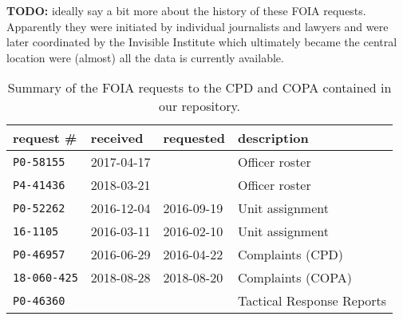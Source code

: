 \textbf{TODO:} ideally say a bit more about the history of these FOIA requests.
Apparently they were initiated by individual journalists and lawyers and were
later coordinated by the Invisible Institute which ultimately became the
central location were (almost) all the data is currently available.

\begin{table}[h]
	\begin{center}
\begin{tabular}{@{}llll@{}}
	\toprule
	request \#&received&requested&description\\
\midrule
	\texttt{P0-58155}&2017-04-17& &Officer roster\\
	\texttt{P4-41436}&2018-03-21& &Officer roster\\
		\texttt{P0-52262}&2016-12-04&2016-09-19&Unit assignment\\
		\texttt{16-1105}&2016-03-11&2016-02-10&Unit assignment\\
	\texttt{P0-46957}&2016-06-29&2016-04-22&Complaints (CPD)\\
	\texttt{18-060-425}&2018-08-28&2018-08-20&Complaints (COPA)\\
	\texttt{P0-46360}& & &Tactical Response Reports\\
\bottomrule
\end{tabular}
\caption{Summary of the FOIA requests to the CPD and COPA contained in our repository.}
\label{table:summary}
\end{center}
\end{table}

